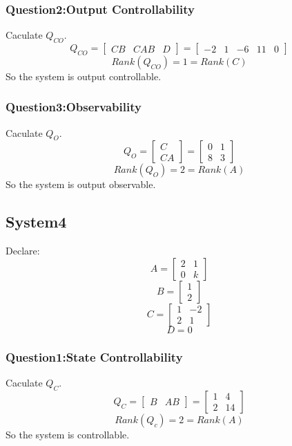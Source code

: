 \documentclass[12pt,a4paper,oneside]{ctexart}
\begin{document}
            \subsubsection{Question2:Output Controllability}
                Caculate $Q_{CO}$.
                $$Q_{CO} = \begin{bmatrix}
                    CB&CAB&D
                \end{bmatrix} = \begin{bmatrix}
                    -2&1&-6&11&0
                \end{bmatrix}$$
                $$Rank(Q_{CO})=1=Rank(C)$$
                So the system is output controllable.
                
            \subsubsection{Question3:Observability}
                Caculate $Q_{O}$.
                $$Q_{O} = \begin{bmatrix}
                    C\\
                    CA
                \end{bmatrix} = \begin{bmatrix}
                    0&1\\
                    8&3
                \end{bmatrix}$$
                $$Rank(Q_{O})=2=Rank(A)$$
                So the system is output observable.

        \subsection{System4}
        Declare:
            $$
            A=\begin{bmatrix}
                2&1\\
                0&k
            \end{bmatrix}
            $$
            $$
            B=\begin{bmatrix}
                1\\
                2
            \end{bmatrix}
            $$
            $$
            C=\begin{bmatrix}
                1&-2\\
                2&1
            \end{bmatrix}
            $$
            $$
            D=0
            $$
            \subsubsection{Question1:State Controllability}
                Caculate $Q_C$.
                $$Q_C = \begin{bmatrix}
                    B&AB
                \end{bmatrix} = \begin{bmatrix}
                    1&4\\
                    2&14
                \end{bmatrix}$$
                $$Rank(Q_c)=2=Rank(A)$$
                So the system is controllable.
\end{document}
